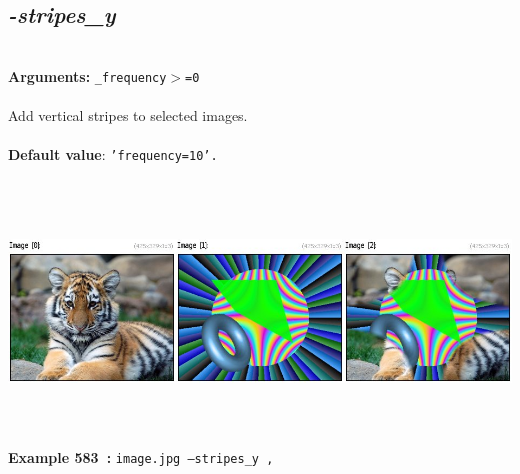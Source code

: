 \documentclass[a4paper,11pt,twoside]{book}
\begin{document}
\subsection{\emph{-stripes\_y} }\vspace*{-0.5em}
~\\\textbf{Arguments: } 
{\small \texttt{\_frequency$>$=0}}\\~\\
Add vertical stripes to selected images.
~\\~\\\textbf{Default value}: {\small \texttt{'frequency=10'.}}
\begin{center}\includegraphics[keepaspectratio=true,height=7cm,width=\textwidth]{img/gmic_def583.jpg}\\
{\footnotesize \textbf{Example 583~:} \texttt{image.jpg --stripes\_y ,}}
\end{center}
\end{document}
